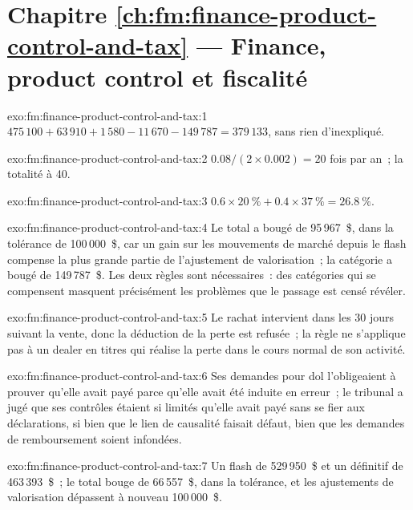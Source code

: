 \section*{Chapitre \ref{ch:fm:finance-product-control-and-tax} --- Finance, product control et fiscalité}

\begin{solution}{exo:fm:finance-product-control-and-tax:1}
$475\,100+63\,910+1\,580-11\,670-149\,787=379\,133$, sans rien d'inexpliqué.
\end{solution}

\begin{solution}{exo:fm:finance-product-control-and-tax:2}
$0.08/(2\times0.002)=20$ fois par an~; la totalité à 40.
\end{solution}

\begin{solution}{exo:fm:finance-product-control-and-tax:3}
$0.6\times20~\%+0.4\times37~\%=26.8~\%$.
\end{solution}

\begin{solution}{exo:fm:finance-product-control-and-tax:4}
Le total a bougé de 95\,967~\$, dans la tolérance de 100\,000~\$, car un gain sur les mouvements de marché depuis le flash compense la plus grande
partie de l'ajustement de valorisation~; la catégorie a bougé de 149\,787~\$. Les deux règles sont nécessaires~: des catégories qui se compensent masquent précisément les problèmes que le passage est censé révéler.
\end{solution}

\begin{solution}{exo:fm:finance-product-control-and-tax:5}
Le rachat intervient dans les 30 jours suivant la vente, donc la déduction de la perte est refusée~; la règle ne s'applique pas à un dealer en titres
qui réalise la perte dans le cours normal de son activité.
\end{solution}

\begin{solution}{exo:fm:finance-product-control-and-tax:6}
Ses demandes pour dol l'obligeaient à prouver qu'elle avait payé parce qu'elle avait été induite en erreur~; le tribunal a jugé que ses contrôles étaient si limités qu'elle avait payé
sans se fier aux déclarations, si bien que le lien de causalité faisait défaut, bien que les demandes de remboursement soient infondées.
\end{solution}

\begin{solution}{exo:fm:finance-product-control-and-tax:7}
Un flash de 529\,950~\$ et un définitif de 463\,393~\$~; le total bouge de 66\,557~\$, dans la tolérance, et les ajustements de valorisation dépassent à nouveau
100\,000~\$.
\end{solution}

